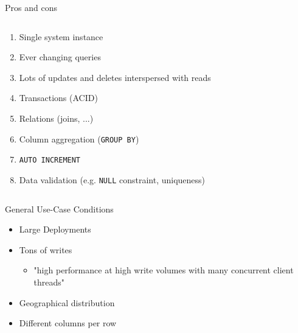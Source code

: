 \documentclass[
  10pt
]{beamer}
\begin{document}
\begin{frame}{Pros and cons \cite{ProsAndCons}}
\begin{columns}[T]
\begin{column}{0.45\textwidth}
      \begin{enumerate}[\textbf{\textcolor{aswe-preferences}{-}}]
        \item<11-> Single system instance
        \item<12-> Ever changing queries
        \item<13-> Lots of updates and deletes interspersed with reads
        \item<14-> Transactions (ACID)
        \item<15-> Relations (joins, ...)
        \item<16-> Column aggregation (\lstinline{GROUP BY})
        \item<17-> \lstinline{AUTO INCREMENT}
        \item<18-> Data validation (e.g. \lstinline{NULL} constraint, uniqueness)
      \end{enumerate}
    \end{column}
  \end{columns}
\end{frame}

\begin{frame}{General Use-Case Conditions \cite{GeneralUseCasesConditions}}
 \begin{itemize}
    \item<1-> Large Deployments
    \item<2-> Tons of writes
      \begin{itemize}
        \item "high performance at high write volumes with many concurrent client threads" \cite{cassandra_oreilly}
      \end{itemize}
    \item<3-> Geographical distribution
    \item<4-> Different columns per row
 \end{itemize}


\end{frame}
\end{document}
